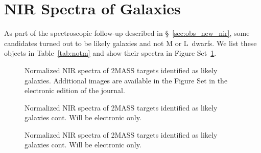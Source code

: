 \documentclass[12pt]{aastex6}
\begin{document}
\appendix
\section{NIR Spectra of Galaxies}
\label{sec:galaxies}
As part of the spectroscopic follow-up described in \S~\ref{sec:obs_new_nir}, some candidates turned out to be likely galaxies and not M or L~dwarfs. We list these objects in Table~\ref{tab:notm} and show their spectra in Figure Set~\ref{fig:notMs_1}.



\figsetstart
{}

\figsetgrpstart
{}
\figsetgrpend

\figsetgrpstart
{}
\figsetgrpend

\figsetgrpstart
{}
\figsetgrpend

\figsetend

\begin{figure}
    \caption{Normalized NIR spectra of 2MASS targets identified as likely galaxies. Additional images are available in the Figure Set in the electronic edition of the journal.}
    \label{fig:notMs_1}
\end{figure}

\begin{figure}
    \caption{Normalized NIR spectra of 2MASS targets identified as likely galaxies cont. Will be electronic only.}
\end{figure}

\begin{figure}
    \caption{Normalized NIR spectra of 2MASS targets identified as likely galaxies cont. Will be electronic only.}
\end{figure}
\clearpage
\end{document}
